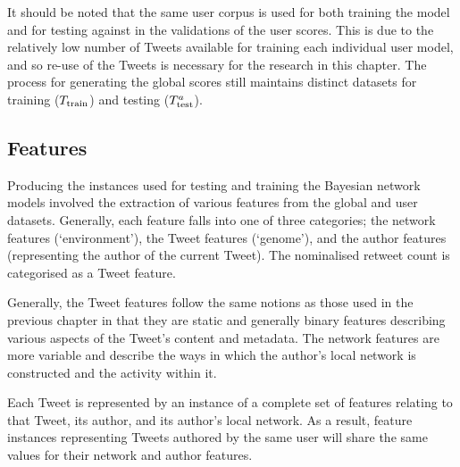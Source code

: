 It should be noted that the same user corpus is used for both training the model and for testing against in the validations of the user scores. This is due to the relatively low number of Tweets available for training each individual user model, and so re-use of the Tweets is necessary for the research in this chapter. The process for generating the global scores still maintains distinct datasets for training ($T_{\textrm{train}}{}$) and testing ($T^a_{\textrm{test}}{}$).





\subsection{Features}
Producing the instances used for testing and training the Bayesian network models involved the extraction of various features from the global and user datasets. Generally, each feature falls into one of three categories; the network features (`environment'), the Tweet features (`genome'), and the author features (representing the author of the current Tweet). The nominalised retweet count is categorised as a Tweet feature.

Generally, the Tweet features follow the same notions as those used in the previous chapter in that they are static and generally binary features describing various aspects of the Tweet's content and metadata. The network features are more variable and describe the ways in which the author's local network is constructed and the activity within it.

Each Tweet is represented by an instance of a complete set of features relating to that Tweet, its author, and its author's local network. As a result, feature instances representing Tweets authored by the same user will share the same values for their network and author features.


